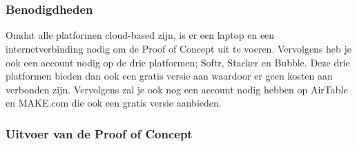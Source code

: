\chapter{}%
\label{ch:proof-of-concept}
\subsection{Benodigdheden}%
\label{subsec:benodigdheden}
Omdat alle platformen cloud-based zijn, is er een laptop en een internetverbinding nodig om de Proof of Concept uit te voeren. Vervolgens heb je ook 
een account nodig op de drie platformen; Softr, Stacker en Bubble. Deze drie platformen bieden dan ook een gratis versie aan waardoor er geen kosten aan verbonden zijn. Vervolgens zal je ook 
nog een account nodig hebben op AirTable en MAKE.com die ook een gratis versie aanbieden.

\subsection{Uitvoer van de Proof of Concept}%
\label{subsec:uitvoer-proof-of-concept}

